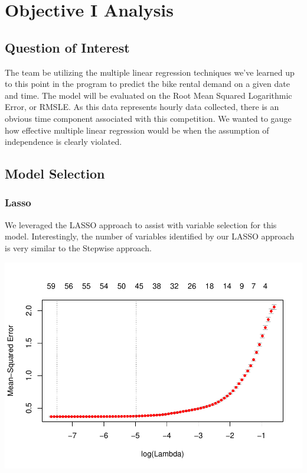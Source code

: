 \documentclass[american,]{article}
\begin{document}
\newpage

\hypertarget{objective-i-analysis}{%
\section{Objective I Analysis}\label{objective-i-analysis}}

\hypertarget{question-of-interest}{%
\subsection{Question of Interest}\label{question-of-interest}}

The team be utilizing the multiple linear regression techniques we've learned up to this point in the program to predict the bike rental demand on a given date and time. The model will be evaluated on the Root Mean Squared Logarithmic Error, or RMSLE. As this data represents hourly data collected, there is an obvious time component associated with this competition. We wanted to gauge how effective multiple linear regression would be when the assumption of independence is clearly violated.

\hypertarget{model-selection}{%
\subsection{Model Selection}\label{model-selection}}

\hypertarget{lasso}{%
\subsubsection{Lasso}\label{lasso}}

We leveraged the LASSO approach to assist with variable selection for this model. Interestingly, the number of variables identified by our LASSO approach is very similar to the Stepwise approach.

\includegraphics{BikeSharingDemand_files/figure-latex/lasso-predictors-1.pdf}
\end{document}
